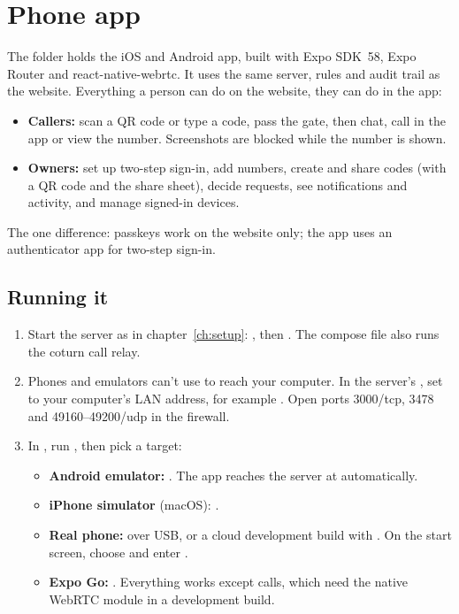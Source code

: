 \chapter{Phone app}
\label{ch:mobile}

The  folder holds the iOS and Android app, built with Expo SDK~58, Expo Router and react-native-webrtc. It uses the same server, rules and audit trail as the website. Everything a person can do on the website, they can do in the app:
\begin{itemize}
  \item \textbf{Callers:} scan a QR code or type a code, pass the gate, then chat, call in the app or view the number. Screenshots are blocked while the number is shown.
  \item \textbf{Owners:} set up two-step sign-in, add numbers, create and share codes (with a QR code and the share sheet), decide requests, see notifications and activity, and manage signed-in devices.
\end{itemize}
The one difference: passkeys work on the website only; the app uses an authenticator app for two-step sign-in.

\section{Running it}

\begin{enumerate}
  \item Start the server as in chapter~\ref{ch:setup}: , then . The compose file also runs the coturn call relay.
  \item Phones and emulators can't use  to reach your computer. In the server's , set  to your computer's LAN address, for example . Open ports 3000/tcp, 3478 and 49160--49200/udp in the firewall.
  \item In , run , then pick a target:
  \begin{itemize}
    \item \textbf{Android emulator:} . The app reaches the server at  automatically.
    \item \textbf{iPhone simulator} (macOS): .
    \item \textbf{Real phone:}  over USB, or a cloud development build with . On the start screen, choose  and enter .
    \item \textbf{Expo Go:} . Everything works except calls, which need the native WebRTC module in a development build.
  \end{itemize}
\end{enumerate}

